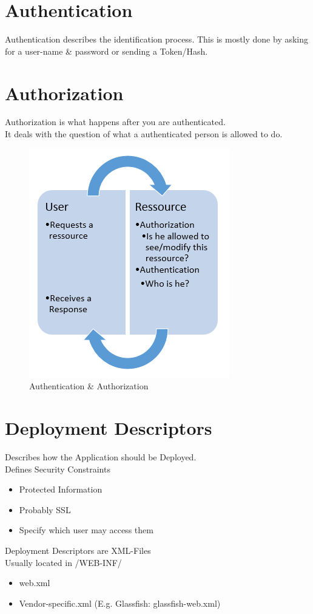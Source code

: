 \documentclass[12pt,a4paper]{report}
\begin{document}
\section{Authentication}
Authentication describes the identification process. This is mostly done by asking for a user-name \& password or sending a Token/Hash.

\section{Authorization}
Authorization is what happens after you are authenticated.\\
It deals with the question of what a authenticated person is allowed to do.\\

\begin{figure}[h]
	\centering
	\includegraphics[width=0.5\linewidth]{res/AuthenAuthor}
	\caption{Authentication \& Authorization}
	\label{fig:AuthenAuthor}
\end{figure}

\section{Deployment Descriptors}
Describes how the Application should be Deployed.\\
Defines Security Constraints\\
\begin{itemize}
	\item Protected Information
	\item Probably SSL
	\item Specify which user may access them
\end{itemize}
Deployment Descriptors are XML-Files\\
Usually located in /WEB-INF/\\
\begin{itemize}
	\item web.xml
	\item Vendor-specific.xml (E.g. Glassfish: glassfish-web.xml)
\end{itemize}
\end{document}

